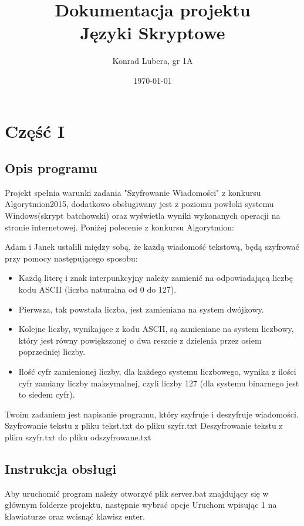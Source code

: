 \documentclass[12pt,a4paper]{article}
\begin{document}
	
	\title{Dokumentacja projektu\\ Języki Skryptowe}
	\author{Konrad Lubera, gr 1A}
	\date{\today}
	
	\maketitle
	\newpage
	\section*{Część I}
	\subsection*{Opis programu}
	 Projekt spełnia warunki zadania "Szyfrowanie Wiadomości" z konkursu Algorytmion2015, dodatkowo obsługiwany jest z poziomu powłoki systemu Windows(skrypt batchowski) oraz wyświetla wyniki wykonanych operacji na stronie internetowej. 
	 \newline
	\newline Poniżej polecenie z konkursu Algorytmion:
	
	Adam i Janek ustalili między sobą, że każdą wiadomość tekstową, będą szyfrować przy pomocy następującego sposobu:
	\begin{itemize}
	\item   Każdą literę i znak interpunkcyjny należy zamienić na odpowiadającą liczbę kodu ASCII (liczba naturalna od 0 do 127).
	\item Pierwsza, tak powstała liczba, jest zamieniana na system dwójkowy.
	\item Kolejne liczby, wynikające z kodu ASCII, są zamieniane na system liczbowy, który jest równy powiększonej o dwa reszcie z dzielenia przez osiem poprzedniej liczby.
	\item  Ilość cyfr zamienionej liczby, dla każdego systemu liczbowego, wynika z ilości cyfr zamiany liczby maksymalnej, czyli liczby 127 (dla systemu binarnego jest to siedem cyfr). 
	\end{itemize}
	Twoim zadaniem jest napisanie programu, który szyfruje i deszyfruje wiadomości. \newline
Szyfrowanie tekstu z pliku tekst.txt do pliku szyfr.txt \newline Deszyfrowanie tekstu z pliku szyfr.txt do pliku odszyfrowane.txt 

	\subsection*{Instrukcja obsługi}
	Aby uruchomić program należy otworzyć plik server.bat znajdujący się w głównym folderze projektu, następnie wybrać opcje Uruchom wpisując 1 na klawiaturze oraz wcisnąć klawisz enter.
	
\end{document}
